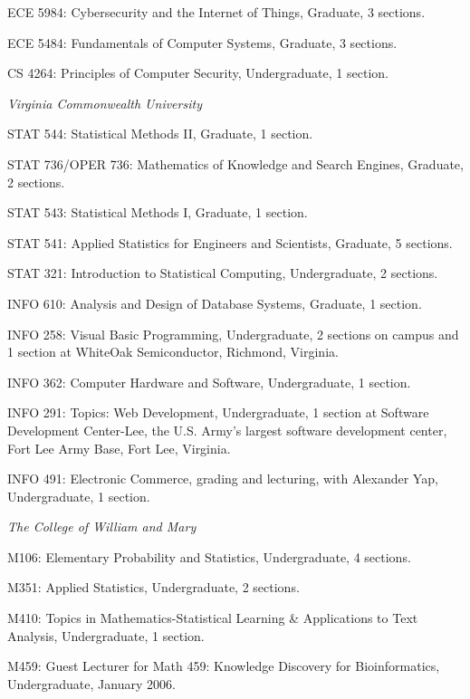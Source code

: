 \documentclass[11pt,article,oneside]{memoir}
\begin{document}
\ind ECE 5984: Cybersecurity and the Internet of Things, Graduate, 3 sections.

\ind ECE 5484: Fundamentals of Computer Systems, Graduate, 3 sections.

\ind CS 4264: Principles of Computer Security, Undergraduate, 1 section.

\bigskip

\noindent\emph{Virginia Commonwealth University \vspace{0.05in}}

\ind STAT 544: Statistical Methods II, Graduate, 1 section.

\ind STAT 736/OPER 736: Mathematics of Knowledge and Search Engines, Graduate, 2 sections.

\ind STAT 543: Statistical Methods I, Graduate, 1 section.

\ind STAT 541: Applied Statistics for Engineers and Scientists, Graduate, 5 sections.

\ind STAT 321: Introduction to Statistical Computing, Undergraduate, 2 sections.

\ind INFO 610: Analysis and Design of Database Systems, Graduate, 1 section.

\ind INFO 258: Visual Basic Programming, Undergraduate, 2 sections on campus and 1 section at WhiteOak Semiconductor, Richmond, Virginia.

\ind INFO 362: Computer Hardware and Software, Undergraduate, 1 section.

\ind INFO 291: Topics: Web Development, Undergraduate, 1 section at Software Development Center-Lee, the U.S. Army’s largest software development center, Fort Lee Army Base, Fort Lee, Virginia.

\ind INFO 491: Electronic Commerce, grading and lecturing, with Alexander Yap, Undergraduate, 1 section. 



\bigskip

\noindent\emph{The College of William and Mary \vspace{0.05in}}

\ind M106: Elementary Probability and Statistics, Undergraduate, 4 sections.

\ind M351: Applied Statistics, Undergraduate, 2 sections.

\ind M410: Topics in Mathematics-Statistical Learning \& Applications to Text Analysis, Undergraduate, 1 section.

\ind M459: Guest Lecturer for Math 459: Knowledge Discovery for Bioinformatics, Undergraduate, January 2006.
\end{document}
